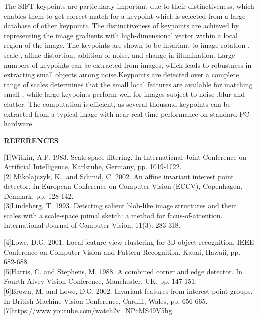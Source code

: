 \documentclass[12pt,a4paper]{report}
\begin{document}
\begin{flushleft}
The SIFT keypoints are particularly important  due to their distinctiveness,
which enables them to get correct match for a keypoint which is selected from a large database of
other keypoints. The distinctiveness of keypoints are achieved by representing the image gradients with  high-dimensional vector within a local region of the image. The keypoints are
shown to be invariant to image rotation , scale ,  affine distortion, addition of noise, and change in illumination. Large numbers of keypoints can be extracted from  images, which leads to robustness in extracting small objects
among noise.Keypoints are detected over a complete range of scales determines that the 
small local features are available for matching small , while large
keypoints perform well for images subject to noise ,blur and clutter. The computation is efficient,
as several thousand keypoints can be extracted from a typical image with near real-time
performance on standard PC hardware.








\newpage

\begin{center}\underline{ \Large \textbf{REFERENCES}}\end{center}

[1]Witkin, A.P. 1983. Scale-space filtering. In International Joint Conference on Artificial Intelligence,
Karlsruhe, Germany, pp. 1019-1022.\\

[2] Mikolajczyk, K., and Schmid, C. 2002. An affine invariant interest point detector. In European
Conference on Computer Vision (ECCV), Copenhagen, Denmark, pp. 128-142.\\

[3]Lindeberg, T. 1993. Detecting salient blob-like image structures and their scales with a scale-space
primal sketch: a method for focus-of-attention. International Journal of Computer Vision, 11(3):
283-318.

[4]Lowe, D.G. 2001. Local feature view clustering for 3D object recognition. IEEE Conference on
Computer Vision and Pattern Recognition, Kauai, Hawaii, pp. 682-688.\\

[5]Harris, C. and Stephens, M. 1988. A combined corner and edge detector. In Fourth Alvey Vision
Conference, Manchester, UK, pp. 147-151.\\

[6]Brown, M. and Lowe, D.G. 2002. Invariant features from interest point groups. In British Machine
Vision Conference, Cardiff, Wales, pp. 656-665.\\

[7]https://www.youtube.com/watch?v=NPcMS49V5hg






 \end{flushleft}
\end{document}
